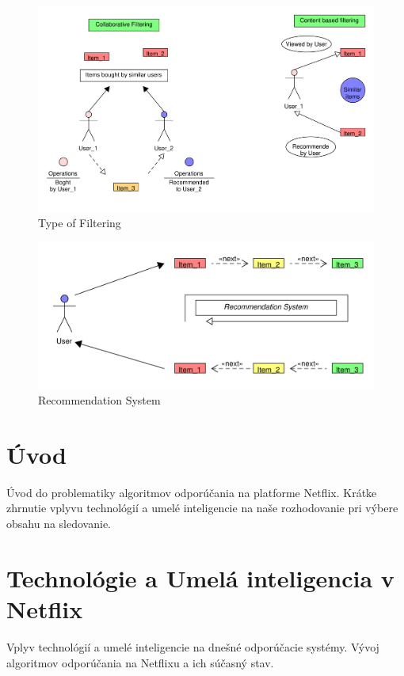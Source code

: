 \documentclass[10pt,twoside,slovak,a4paper]{article}
\begin{document}
\begin{figure}[h!]
  \centering
  \includegraphics[width=1\textwidth]{Images/Filtering_pdf.pdf} %
  \caption{Type of Filtering}
\end{figure}


\begin{figure}[h!]
  \centering
  \includegraphics[width=1\textwidth]{Images/RecommendationSystem_pdf.pdf} %
  \caption{Recommendation System}
\end{figure}


\section{Úvod}
Úvod do problematiky algoritmov odporúčania na platforme Netflix.
Krátke zhrnutie vplyvu technológií a umelé inteligencie na naše rozhodovanie pri výbere obsahu na sledovanie.

\section{Technológie a Umelá inteligencia v Netflix}
Vplyv technológií a umelé inteligencie na dnešné odporúčacie systémy.
Vývoj algoritmov odporúčania na Netflixu a ich súčasný stav.
\end{document}
